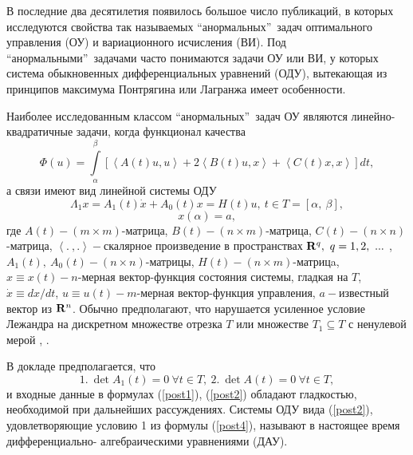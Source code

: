 
В последние два десятилетия появилось большое число публикаций, в которых исследуются
свойства так называемых ``анормальных''\ задач оптимального управления (ОУ) и вариационного исчисления (ВИ).
Под ``анормальными''\ задачами часто понимаются задачи ОУ или ВИ, у которых 
система обыкновенных дифференциальных уравнений (ОДУ), вытекающая из принципов максимума Понтрягина или Лагранжа имеет особенности.

Наиболее исследованным классом ``анормальных''\ задач  ОУ  являются линейно- квадратичные задачи, когда функционал качества
\begin{equation}\label{post1}
\Phi (u)=\int\limits_{\alpha}^{\beta}[\left\langle A(t)u,u \right\rangle +2
\left\langle B(t)u,x \right\rangle+\left\langle  C(t)x,x \right\rangle ]dt,
\end{equation}
а связи имеют вид линейной системы ОДУ
\begin{equation}\label{post2}
\Lambda_1x=A_1(t)\dot x+A_0(t)x= H(t)u,\ t\in T=[\alpha,\ \beta],
\end{equation}
\begin{equation}\label{post3}
x(\alpha)=a,
\end{equation}
где $A(t)-(m\times m)$-матрица, $B(t)-(n\times m)$-матрица,
$C(t)-(n\times n)$-матрица,
$\left\langle  .\ ,. \right\rangle -$скалярное
произведение в пространствах ${\bf R}^q,\ q=1,2,\ ...\ $,
$A_1(t),\  A_0(t)-(n\times n)$-матрицы,
$H(t)-(n\times m)$-матрицa, $x\equiv x(t)-n$-мерная вектор-функция состояния системы, гладкая на  $T$,
$\dot {x}\equiv dx/dt$, $u\equiv u(t)-m$-мерная вектор-функция управления, $a -$известный вектор из ${\bf R}^n$.
Обычно предполагают, что нарушается усиленное условие Лежандра на  дискретном множестве отрезка $T$ \cite{aru} или множестве $T_1\subseteq T$ с ненулевой мерой \cite{dmit2021}, \cite{kurmerz}.

В докладе предполагается,  что
\begin{equation}\label{post4}
1. \ \det A_1(t)=0 \ \forall t\in T,\ 2. \ \det A(t)=0 \ \forall t\in T,
\end{equation}
и входные данные в формулах (\ref{post1}), (\ref{post2}) обладают гладкостью,
необходимой при дальнейших рассуждениях.
Системы ОДУ вида (\ref{post2}), удовлетворяющие условию 1 из формулы (\ref{post4}), называют в настоящее время диф\-фе\-ренциально- ал\-геб\-раическими уравнениями (ДАУ).


